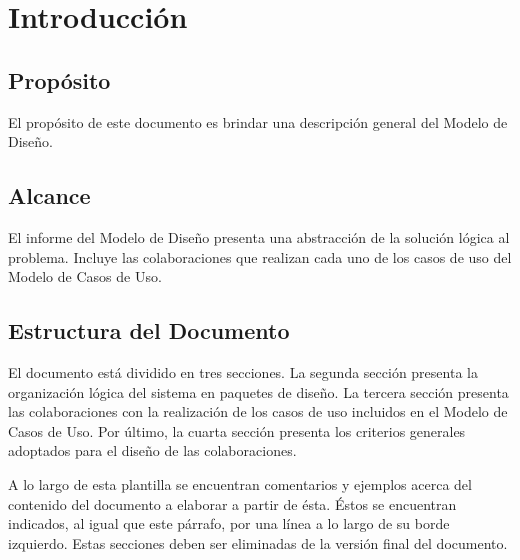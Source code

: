 \documentclass[10pt,spanish]{article}
\numberwithin{figure}{section} %
\begin{document}
\newpage
\tableofcontents

\newpage
\section{Introducción}
\subsection{Propósito}
El propósito de este documento es brindar una descripción general del Modelo de Diseño.

\subsection{Alcance}
El informe del Modelo de Diseño presenta una abstracción de la solución lógica al problema. Incluye las colaboraciones que realizan cada uno de los casos de uso del Modelo de Casos de Uso.

\subsection{Estructura del Documento}
El documento está dividido en tres secciones. La segunda sección presenta la organización lógica del sistema en paquetes de diseño. La tercera sección presenta las colaboraciones con la realización de los casos de uso incluidos en el Modelo de Casos de Uso. Por último, la cuarta sección presenta los criterios generales adoptados para el diseño de las colaboraciones.

\begin{siderules}
A lo largo de esta plantilla se encuentran comentarios y ejemplos acerca del contenido del documento a elaborar a partir de ésta. Éstos se encuentran indicados, al igual que este párrafo, por una línea a lo largo de su borde izquierdo. Estas secciones deben ser eliminadas de la versión final del documento.
\end{siderules}
\end{document}
